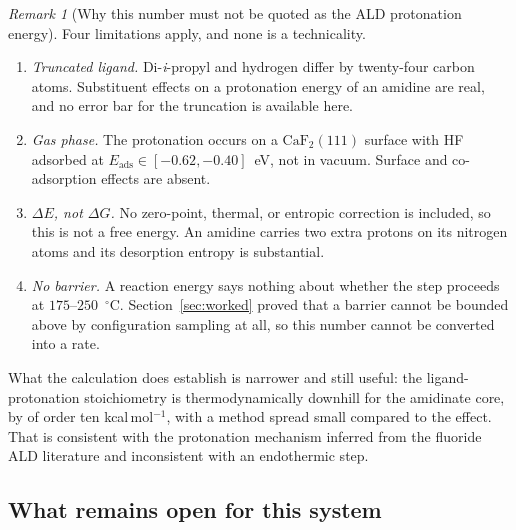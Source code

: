 \documentclass[11pt,a4paper]{article}
\theoremstyle{plain}
\theoremstyle{definition}
\theoremstyle{remark}
\newtheorem{remark}[theorem]{Remark}
\begin{document}
\begin{remark}[Why this number must not be quoted as the ALD protonation energy]
Four limitations apply, and none is a technicality.
\begin{enumerate}
\item \emph{Truncated ligand.} Di-\emph{i}-propyl and hydrogen differ by
twenty-four carbon atoms. Substituent effects on a protonation energy of an
amidine are real, and no error bar for the truncation is available here.
\item \emph{Gas phase.} The protonation occurs on a $\mathrm{CaF_2}(111)$ surface
with HF adsorbed at $E_{\mathrm{ads}} \in[-0.62,-0.40]$~eV, not in vacuum. Surface
and co-adsorption effects are absent.
\item \emph{$\Delta E$, not $\Delta G$.} No zero-point, thermal, or entropic
correction is included, so this is not a free energy. An amidine carries two extra
protons on its nitrogen atoms and its desorption entropy is substantial.
\item \emph{No barrier.} A reaction energy says nothing about whether the step
proceeds at $175$--$250$~$^\circ$C. Section~\ref{sec:worked} proved that a barrier
cannot be bounded above by configuration sampling at all, so this number cannot be
converted into a rate.
\end{enumerate}
What the calculation does establish is narrower and still useful: the
ligand-protonation stoichiometry is thermodynamically downhill for the amidinate
core, by of order ten kcal\,mol$^{-1}$, with a method spread small compared to the
effect. That is consistent with the protonation mechanism inferred from the
fluoride ALD literature and inconsistent with an endothermic step.
\end{remark}

\subsection{What remains open for this system}
\end{document}
